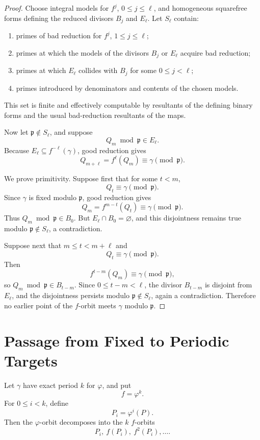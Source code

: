\documentclass[11pt]{article}
\begin{document}
\begin{proof}
Choose integral models for \(f^j\), \(0\le j\le\ell\), and homogeneous squarefree forms defining the reduced divisors \(B_j\) and \(E_\ell\). Let \(S_\ell\) contain:
\begin{enumerate}[label=(\roman*)]
\item primes of bad reduction for \(f^j\), \(1\le j\le\ell\);
\item primes at which the models of the divisors \(B_j\) or \(E_\ell\) acquire bad reduction;
\item primes at which \(E_\ell\) collides with \(B_j\) for some \(0\le j<\ell\);
\item primes introduced by denominators and contents of the chosen models.
\end{enumerate}
This set is finite and effectively computable by resultants of the defining binary forms and the usual bad-reduction resultants of the maps.

Now let \(\mathfrak p\notin S_\ell\), and suppose
\[
Q_m\bmod\mathfrak p\in E_\ell.
\]
Because \(E_\ell\subseteq f^{-\ell}(\gamma)\), good reduction gives
\[
Q_{m+\ell}=f^\ell(Q_m)\equiv\gamma\pmod{\mathfrak p}.
\]

We prove primitivity. Suppose first that for some \(t<m\),
\[
Q_t\equiv\gamma\pmod{\mathfrak p}.
\]
Since \(\gamma\) is fixed modulo \(\mathfrak p\), good reduction gives
\[
Q_m=f^{m-t}(Q_t)\equiv\gamma\pmod{\mathfrak p}.
\]
Thus \(Q_m\bmod\mathfrak p\in B_0\). But \(E_\ell\cap B_0=\varnothing\), and this disjointness remains true modulo \(\mathfrak p\notin S_\ell\), a contradiction.

Suppose next that \(m\le t<m+\ell\) and
\[
Q_t\equiv\gamma\pmod{\mathfrak p}.
\]
Then
\[
f^{t-m}(Q_m)\equiv\gamma\pmod{\mathfrak p},
\]
so \(Q_m\bmod\mathfrak p\in B_{t-m}\). Since \(0\le t-m<\ell\), the divisor \(B_{t-m}\) is disjoint from \(E_\ell\), and the disjointness persists modulo \(\mathfrak p\notin S_\ell\), again a contradiction. Therefore no earlier point of the \(f\)-orbit meets \(\gamma\) modulo \(\mathfrak p\).
\end{proof}

\section{Passage from Fixed to Periodic Targets}

Let \(\gamma\) have exact period \(k\) for \(\varphi\), and put
\[
f=\varphi^k.
\]
For \(0\le i<k\), define
\[
P_i=\varphi^i(P).
\]
Then the \(\varphi\)-orbit decomposes into the \(k\) \(f\)-orbits
\[
P_i,\ f(P_i),\ f^2(P_i),\ldots.
\]
\end{document}
